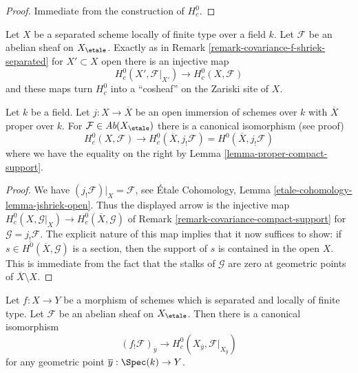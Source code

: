 \begin{proof}
Immediate from the construction of $H^0_c$.
\end{proof}

\begin{remark}
\label{remark-covariance-compact-support}
Let $X$ be a separated scheme locally of finite type over a field $k$.
Let $\mathcal{F}$ be an abelian sheaf on $X_\etale$.
Exactly as in Remark \ref{remark-covariance-f-shriek-separated}
for $X' \subset X$ open there is an injective map
$$
H^0_c(X', \mathcal{F}|_{X'}) \longrightarrow H^0_c(X, \mathcal{F})
$$
and these maps turn $H^0_c$ into a ``cosheaf'' on the Zariski site of $X$.
\end{remark}

\begin{lemma}
\label{lemma-compactify-compact-support}
Let $k$ be a field. Let $j : X \to \overline{X}$ be an open
immersion of schemes over $k$ with $\overline{X}$ proper over $k$.
For $\mathcal{F} \in \textit{Ab}(X_\etale)$
there is a canonical isomorphism (see proof)
$$
H^0_c(X, \mathcal{F}) \longrightarrow
H^0_c(\overline{X}, j_!\mathcal{F}) =
H^0(\overline{X}, j_!\mathcal{F})
$$
where we have the equality on the right by
Lemma \ref{lemma-proper-compact-support}.
\end{lemma}

\begin{proof}
We have $(j_!\mathcal{F})|_X = \mathcal{F}$, see
\'Etale Cohomology, Lemma \ref{etale-cohomology-lemma-jshriek-open}.
Thus the displayed arrow is the injective map
$H^0_c(X, \mathcal{G}|_X) \to H^0_c(\overline{X}, \mathcal{G})$
of Remark \ref{remark-covariance-compact-support}
for $\mathcal{G} = j_!\mathcal{F}$. The explicit nature
of this map implies that it now suffices to show: if
$s \in H^0(\overline{X}, \mathcal{G})$ is a section, then the support of
$s$ is contained in the open $X$. This is immediate from the fact
that the stalks of $\mathcal{G}$ are zero at geometric
points of $\overline{X} \setminus X$.
\end{proof}

\begin{lemma}
\label{lemma-stalk-f-shriek-separated}
Let $f : X \to Y$ be a morphism of schemes which is separated and
locally of finite type. Let $\mathcal{F}$ be an abelian sheaf on
$X_\etale$. Then there is a canonical isomorphism
$$
(f_!\mathcal{F})_{\overline{y}}
\longrightarrow
H^0_c(X_{\overline{y}}, \mathcal{F}|_{X_{\overline{y}}})
$$
for any geometric point $\overline{y} : \Spec(k) \to Y$.
\end{lemma}

